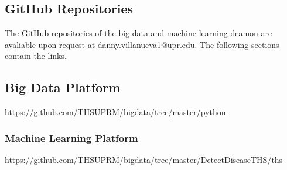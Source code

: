 \documentclass[12pt]{report}
\begin{document}

 

\begin{appendices}
\chapter{GitHub Repositories}
The GitHub repositories of the big data and machine learning deamon are avaliable upon request at danny.villanueva1@upr.edu. The following sections contain the links.

\section{Big Data Platform}
https://github.com/THSUPRM/bigdata/tree/master/python

\subsection{Machine Learning Platform}
https://github.com/THSUPRM/bigdata/tree/master/DetectDiseaseTHS/ths
\end{appendices}
\end{document}
